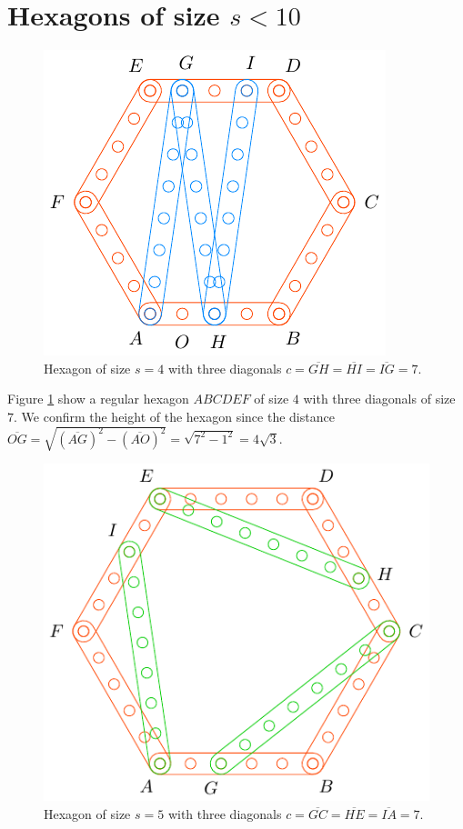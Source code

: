 \documentclass[11pt]{article}
\begin{document}
\section{Hexagons of size $s < 10$}

\begin{figure}[H]
\centering
\includegraphics[scale=1]{4/hexa-4a}
\caption{Hexagon of size $s = 4$ with three diagonals $c = \overline{GH} = \overline{HI} = \overline{IG} = 7$.}
\label{fig:4a}
\end{figure}

Figure \ref{fig:4a} show a regular hexagon $ABCDEF$ of size $4$ with three diagonals of size $7$. We confirm the height of the hexagon since the distance $\overline{OG} = \sqrt{(\overline{AG})^2 - (\overline{AO})^2} = \sqrt{7^2 - 1^2} = 4\sqrt3$.

\begin{figure}[H]
\centering
\includegraphics[scale=1]{5/hexa-5a}
\caption{Hexagon of size $s = 5$ with three diagonals $c = \overline{GC} = \overline{HE} = \overline{IA} = 7$.}
\label{fig:5a}
\end{figure}
\end{document}
